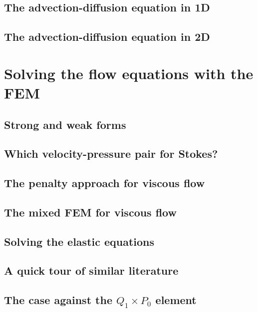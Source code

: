 \documentclass[a4paper]{article}
\begin{document}
\subsection{The advection-diffusion equation in 1D} \label{sec:advec-diff1D} %
\subsection{The advection-diffusion equation in 2D}




\newpage 
\section{Solving the flow equations with the FEM} \label{solvingFEM} %
\subsection{Strong and weak forms}  %
\subsection{Which velocity-pressure pair for Stokes?}  %
\subsection{The penalty approach for viscous flow}  %
\subsection{The mixed FEM for viscous flow}  %
\subsection{Solving the elastic equations} %
\subsection{A quick tour of similar literature}  %
\subsection{The case against the $Q_1\times P_0$ element}  %
\end{document}
